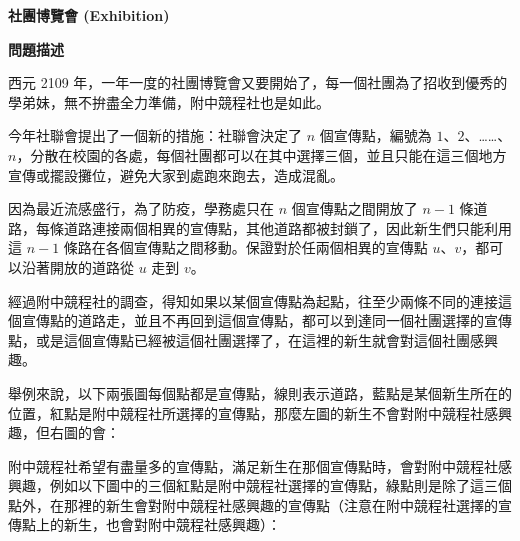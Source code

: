 \documentclass[12pt]{article}
\begin{document}
\renewcommand{\headrulewidth}{0pt}
\cfoot{}
\lhead{}
\chead{}
\rhead{}

\pagestyle{fancy}
\setlength\parindent{24pt}
\newcommand{\parspace}{\vspace{10pt}}
\newcommand{\sectitle}[1]{\parspace\noindent\textbf{#1}}


\Large
\begin{center}
    \textbf{社團博覽會 (Exhibition)}
\end{center}
\normalsize

\sectitle{問題描述}

西元 2109 年，一年一度的社團博覽會又要開始了，每一個社團為了招收到優秀的學弟妹，無不拚盡全力準備，附中競程社也是如此。

今年社聯會提出了一個新的措施：社聯會決定了 $n$ 個宣傳點，編號為 $1$、$2$、……、$n$，分散在校園的各處，每個社團都可以在其中選擇三個，並且只能在這三個地方宣傳或擺設攤位，避免大家到處跑來跑去，造成混亂。

因為最近流感盛行，為了防疫，學務處只在 $n$ 個宣傳點之間開放了 $n-1$ 條道路，每條道路連接兩個相異的宣傳點，其他道路都被封鎖了，因此新生們只能利用這 $n-1$ 條路在各個宣傳點之間移動。保證對於任兩個相異的宣傳點 $u$、$v$，都可以沿著開放的道路從 $u$ 走到 $v$。

經過附中競程社的調查，得知如果以某個宣傳點為起點，往至少兩條不同的連接這個宣傳點的道路走，並且不再回到這個宣傳點，都可以到達同一個社團選擇的宣傳點，或是這個宣傳點已經被這個社團選擇了，在這裡的新生就會對這個社團感興趣。

舉例來說，以下兩張圖每個點都是宣傳點，線則表示道路，藍點是某個新生所在的位置，紅點是附中競程社所選擇的宣傳點，那麼左圖的新生不會對附中競程社感興趣，但右圖的會：

\begin{center}
    
    
\end{center}

附中競程社希望有盡量多的宣傳點，滿足新生在那個宣傳點時，會對附中競程社感興趣，例如以下圖中的三個紅點是附中競程社選擇的宣傳點，綠點則是除了這三個點外，在那裡的新生會對附中競程社感興趣的宣傳點（注意在附中競程社選擇的宣傳點上的新生，也會對附中競程社感興趣）：

\begin{center}
    
\end{center}
\end{document}
